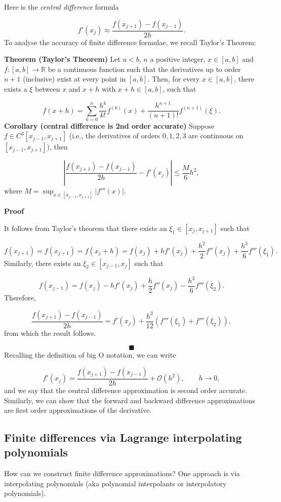 \documentclass[12pt,landscape]{article}
\begin{document}
{Here is the \emph{central difference} formula

\[
f'(x_j) \approx \frac{f(x_{j+1})-f(x_{j-1})}{2h}.
\]
To analyse the accuracy of finite difference formulae, we recall Taylor's Theorem:

\textbf{Theorem (Taylor's Theorem)}  Let $a<b$, $n$ a positive integer, $x\in[a,b]$ and $f: [a,b]\to\mathbb{R}$ be a continuous function such that the derivatives up to order $n+1$ (inclusive) exist at every point in $[a,b]$. Then, for every $x\in[a,b]$, there exists a $\xi$ between $x$ and $x+h$ with $x+h\in[a,b]$, such that

\[
f(x+h)=\sum_{k=0}^{n}\frac{h^k}{k!}f^{(k)}(x)+\frac{h^{n+1}}{(n+1)!}f^{(n+1)}(\xi).
\]
\textbf{Corollary (central difference is 2nd order accurate)} Suppose $f \in C^3[x_{j-1},x_{j+1}]$ (i.e., the derivatives of orders $0, 1, 2, 3$ are continuous on $[x_{j-1},x_{j+1}]$), then 

\[
\left\vert\frac{f(x_{j+1})-f(x_{j-1})}{2h} - f'(x_j) \right\vert \leq \frac{M}{6}h^2, 
\]
where $M = \sup_{x \in [x_{j-1}, x_{j+1}]} \vert f'''(x) \vert$.

\textbf{Proof}

It follows from Taylor's theorem that there exists an $\xi_1 \in [x_{j}, x_{j+1}]$ such that 

\[
f(x_{j+ 1}) = f(x_{j + 1}) = f(x_j + h) = f(x_j) + h f'(x_j) + \frac{h^2}{2}f''(x_j) + \frac{h^3}{6}f'''(\xi_1).
\]
Similarly, there exists an $\xi_2 \in [x_{j-1}, x_{j}]$ such that 

\[
f(x_{j- 1}) = f(x_j) - h f'(x_j) + \frac{h}{2}f''(x_j) - \frac{h^3}{6}f'''(\xi_2).
\]
Therefore,

\[
\frac{f(x_{j+1})-f(x_{j-1})}{2h} = f'(x_j) + \frac{h^2}{12}\left( f'''(\xi_1) + f'''(\xi_2)   \right),
\]
from which the result follows.

\[
\blacksquare
\]
Recalling the definition of big O notation, we can write

\[
f'(x_j) = \frac{f(x_{j+1})-f(x_{j-1})}{2h} + \mathcal{O}(h^2), \qquad h \to 0,
\]
and we say that the central difference approximation is second order accurate.  Similarly, we can show that the forward and backward difference approximations are first order approximations of the derivative.

\subsection{Finite differences via Lagrange interpolating polynomials}
How can we construct finite difference approximations?  One approach is via interpolating polynomials (aka polynomial interpolants or interpolatory polynomials).

}
\end{document}
